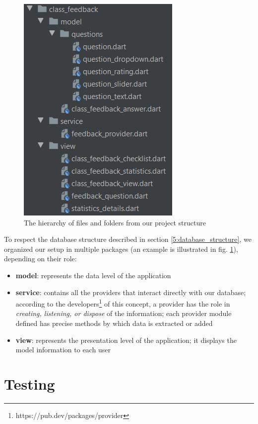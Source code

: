     \begin{figure}
            \centering
            \includegraphics[width=0.4\columnwidth]{figures/project_structure.png}
            \captionsetup{labelsep=space, textformat=empty}
            \caption{The hierarchy of files and folders from our project structure}
            \label{5:fig:project_structure}
    \end{figure}
    
    To respect the database structure described in section \ref{5:database_structure}, we organized our setup in multiple packages (an example is illustrated in fig. \ref{5:fig:project_structure}), depending on their role:
    
    \begin{itemize}
            \setlength{\topsep}{0.5pt}
            \setlength{\itemsep}{0.5pt}
            \setlength{\parsep}{0.5pt}
            \item \textbf{model}: represents the data level of the application
            \item \textbf{service}: contains all the providers that interact directly with our database; according to the developers\footnote{https://pub.dev/packages/provider} of this concept, a provider has the role in \textit{creating, listening, or dispose} of the information; each provider module defined has precise methods by which data is extracted or added
            \item \textbf{view}: represents the presentation level of the application; it displays the model information to each user
\end{itemize}

\section{Testing} \label{5:testing}

